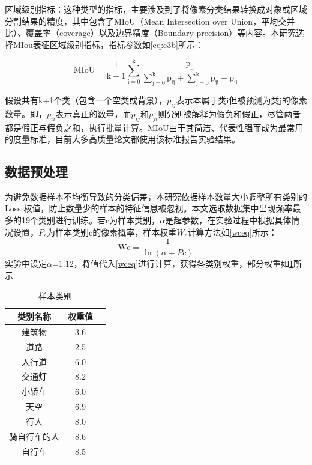 区域级别指标：这种类型的指标，主要涉及到了将像素分类结果转换成对象或区域分割结果的精度，其中包含了MIoU（Mean Intersection over Union，平均交并比）、覆盖率（coverage）以及边界精度（Boundary precision）等内容。本研究选择MIou表征区域级别指标，指标参数如\cref*{eq:e3b}所示：

\begin{equation}
    \mathrm{MIoU}=\frac{1}{\mathrm{k}+1} \sum_{\mathrm{i}=0}^{\mathrm{k}} \frac{\mathrm{p}_{\mathrm{ii}}}{\sum_{\mathrm{j}=0}^{\mathrm{k}} \mathrm{p}_{\mathrm{ij}}+\sum_{\mathrm{j}=0}^{\mathrm{k}} \mathrm{p}_{\mathrm{ji}}-\mathrm{p}_{\mathrm{ii}}}
    \label{eq:e3b}
\end{equation}


假设共有k+1个类（包含一个空类或背景），$p_{ij}$表示本属于类i但被预测为类j的像素数量。即，$p_{ii}$表示真正的数量，而$p_{ij}$和$p_{ji}$则分别被解释为假负和假正，尽管两者都是假正与假负之和，执行批量计算。MIoU由于其简洁、代表性强而成为最常用的度量标准，目前大多高质量论文都使用该标准报告实验结果。


\subsection{数据预处理}
为避免数据样本不均衡导致的分类偏差，本研究依据样本数量大小调整所有类别的 Loss 权值，防止数量少的样本的特征信息被忽视。本文选取数据集中出现频率最多的19个类别进行训练。若c为样本类别，$\alpha$是超参数，在实验过程中根据具体情况设置，$P_c$为样本类别c的像素概率，样本权重$W_c$计算方法如\cref*{wceq}所示：
\begin{equation}
    \mathrm{Wc}=\frac{1}{\ln (\alpha+P c)}
    \label{wceq}
\end{equation}
实验中设定$\alpha$=1.12，将值代入\cref*{wceq}进行计算，获得各类别权重，部分权重如\cref*{tab:3.2.1}所示
\begin{table}[htb]
    \caption{样本类别}
    \centering
    \begin{tabular}{ccc}
        \toprule
        类别名称   & 权重值 \\
        \midrule
        建筑物    & 3.6 \\
        道路     & 2.5 \\
        人行道    & 6.0 \\
        交通灯    & 8.2 \\
        小轿车    & 6.0 \\
        天空     & 6.9 \\
        行人     & 8.0 \\
        骑自行车的人 & 8.6 \\
        自行车    & 8.5 \\
        \bottomrule
    \end{tabular}
    \label{tab:3.2.1}
\end{table}

